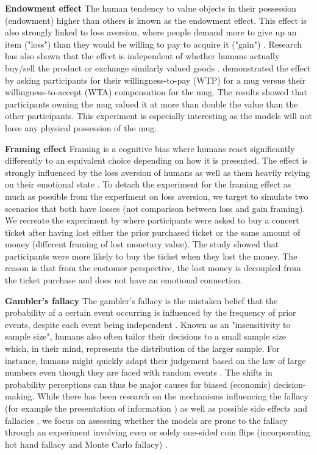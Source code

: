 \par \textbf{Endowment effect} The human tendency to value objects in their possession (endowment) higher than others is known as the endowment effect. This effect is also strongly linked to loss aversion, where people demand more to give up an item ("loss") than they would be willing to pay to acquire it ("gain") \parencite{kahneman1990experimental}. Research has also shown that the effect is independent of whether humans actually buy/sell the product or exchange similarly valued goods \parencite{knetsch1989endowment}. \textcite{kahneman1990experimental} demonstrated the effect by asking participants for their willingness-to-pay (WTP) for a mug versus their willingness-to-accept (WTA) compensation for the mug. The results showed that participants owning the mug valued it at more than double the value than the other participants. This experiment is especially interesting as the models will not have any physical possession of the mug.

\par \textbf{Framing effect} Framing is a cognitive bias where humans react significantly differently to an equivalent choice depending on how it is presented. The effect is strongly influenced by the loss aversion of humans as well as them heavily relying on their emotional state \parencite{tversky1981framing}. To detach the experiment for the framing effect as much as possible from the experiment on loss aversion, we target to simulate two scenarios that both have losses (not comparison between loss and gain framing). We recreate the experiment by \textcite{tversky1981framing} where participants were asked to buy a concert ticket after having lost either the prior purchased ticket or the same amount of money (different framing of lost monetary value). The study showed that participants were more likely to buy the ticket when they lost the money. The reason is that from the customer perspective, the lost money is decoupled from the ticket purchase and does not have an emotional connection.

\par \textbf{Gambler's fallacy} The gambler's fallacy is the mistaken belief that the probability of a certain event occurring is influenced by the frequency of prior events, despite each event being independent \parencite{bar1991perception,kovic2019gambler}. Known as an "insensitivity to sample size", humans also often tailor their decisions to a small sample size which, in their mind, represents the distribution of the larger sample. For instance, humans might quickly adapt their judgement based on the law of large numbers even though they are faced with random events \parencite{tversky1974judgment}. The shifts in probability perceptions can thus be major causes for biased (economic) decision-making. While there has been research on the mechanisms influencing the fallacy (for example the presentation of information \parencite{barron2010role}) as well as possible side effects and fallacies \parencite{kovic2019gambler}, we focus on assessing whether the models are prone to the fallacy through an experiment involving even or solely one-sided coin flips (incorporating hot hand fallacy and Monte Carlo fallacy) \parencite{leonard2015gambling}.

